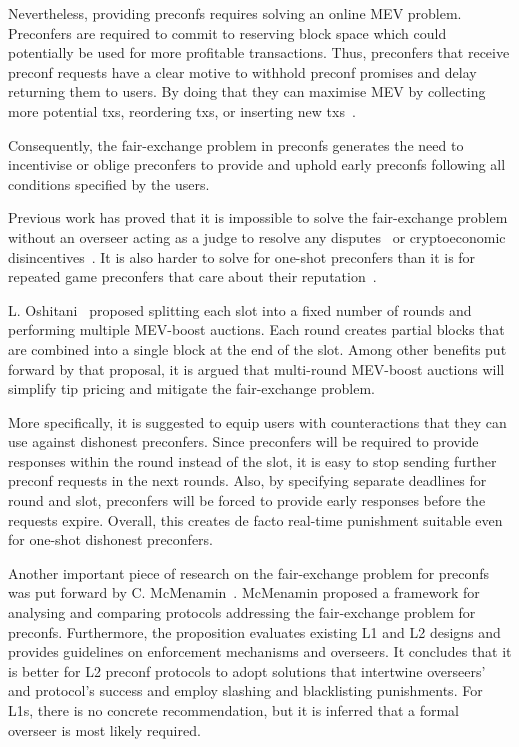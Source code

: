 \documentclass[conference]{IEEEtran}
\theoremstyle{boldstyle}
\begin{document}
    Nevertheless, providing preconfs requires solving an online MEV problem. Preconfers are required to commit to reserving block space which could potentially be used for more profitable transactions. Thus, preconfers that receive preconf requests have a clear motive to withhold preconf promises and delay returning them to users. By doing that they can maximise MEV by collecting more potential txs, reordering txs, or inserting new txs~\cite{W:StrawmanningBasedPreconfirmations}.

    Consequently, the fair-exchange problem in preconfs generates the need to incentivise or oblige preconfers to provide and uphold early preconfs following all conditions specified by the users.

    Previous work has proved that it is impossible to solve the fair-exchange problem without an overseer acting as a judge to resolve any disputes~\cite{P:OntheImpossibilityofFairExchangewithoutaTrustedThirdParty} or cryptoeconomic disincentives~\cite{W:Fairexchangewithoutatrustedthirdparty}. It is also harder to solve for one-shot preconfers than it is for repeated game preconfers that care about their reputation~\cite{W:PreconfirmationFairExchange}. 

    L. Oshitani~\cite{W:BasedPreconfirmationswithMulti-roundMEV-Boost} proposed splitting each slot into a fixed number of rounds and performing multiple MEV-boost auctions. Each round creates partial blocks that are combined into a single block at the end of the slot. Among other benefits put forward by that proposal, it is argued that multi-round MEV-boost auctions will simplify tip pricing and mitigate the fair-exchange problem.

    More specifically, it is suggested to equip users with counteractions that they can use against dishonest preconfers. Since preconfers will be required to provide responses within the round instead of the slot, it is easy to stop sending further preconf requests in the next rounds. Also, by specifying separate deadlines for round and slot, preconfers will be forced to provide early responses before the requests expire. Overall, this creates de facto real-time punishment suitable even for one-shot dishonest preconfers.

    Another important piece of research on the fair-exchange problem for preconfs was put forward by C. McMenamin~\cite{W:PreconfirmationFairExchange}. McMenamin proposed a framework for analysing and comparing protocols addressing the fair-exchange problem for preconfs. Furthermore, the proposition evaluates existing L1 and L2 designs and provides guidelines on enforcement mechanisms and overseers. It concludes that it is better for L2 preconf protocols to adopt solutions that intertwine overseers' and protocol's success and employ slashing and blacklisting punishments. For L1s, there is no concrete recommendation, but it is inferred that a formal overseer is most likely required.
\end{document}
